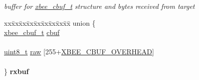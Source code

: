 \begin{DoxyCompactItemize}
\begin{DoxyCompactList}\small\item\em buffer for \hyperlink{structxbee__cbuf__t}{xbee\+\_\+cbuf\+\_\+t} structure and bytes received from target \end{DoxyCompactList}\item 
\mbox{\label{group__xbee__ota__client_ga8a3826497465a168bcbbb5de14ea9595}} 
\begin{tabbing}
xx\=xx\=xx\=xx\=xx\=xx\=xx\=xx\=xx\=\kill
union \{\\
\>\hyperlink{structxbee__cbuf__t}{xbee\_cbuf\_t} \hyperlink{group__xbee__ota__client_gaa86751bccf68cd96c559cd1947e455c9}{cbuf}\\
\>\\
\>\hyperlink{group__hal__dos_gae1affc9ca37cfb624959c866a73f83c2}{uint8\_t} \hyperlink{group__xbee__ota__client_gafaab4db801ec47fb901e28ee4c4eac04}{raw} \mbox{[}255+\hyperlink{group__util__cbuf_ga6fb73f000c9aa3d2b26f3ae089676bfa}{XBEE\_CBUF\_OVERHEAD}\mbox{]}\\
\>\\
\} {\bfseries rxbuf}\\


\end{tabbing}
\end{DoxyCompactItemize}
